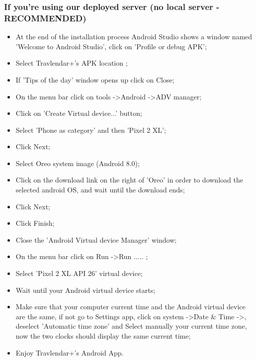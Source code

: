\subsubsection{If you're using our deployed server (no local server - RECOMMENDED)}
\begin{itemize}
	\item At the end of the installation process Android Studio shows a window named 'Welcome to Android Studio', click on 'Profile or debug APK';
	\item Select Travlendar+'s APK location ;
	\item If 'Tips of the day' window opens up click on Close;
	\item On the menu bar click on tools -\textgreater Android -\textgreater ADV manager;
	\item Click on 'Create Virtual device...' button;
	\item Select 'Phone as category' and then 'Pixel 2 XL';
	\item Click Next;
	\item Select Oreo system image (Android 8.0);
	\item Click on the download link on the right of 'Oreo' in order to download the selected android OS, and wait until the download ends; 
	\item Click Next;
	\item Click Finish;
	\item Close the 'Android Virtual device Manager' window;
	\item On the menu bar click on Run -\textgreater Run ..... ;
	\item Select 'Pixel 2 XL API 26' virtual device;
	\item Wait until your Android virtual device starts;
	\item Make sure that your computer current time and the Android virtual device are the same, if not go to Settings app, click on system -\textgreater Date \& Time -\textgreater, deselect 'Automatic time zone' and Select manually your current time zone, now the two clocks should display the same current time;
	\item Enjoy Travlendar+'s Android App.	
\end{itemize}

